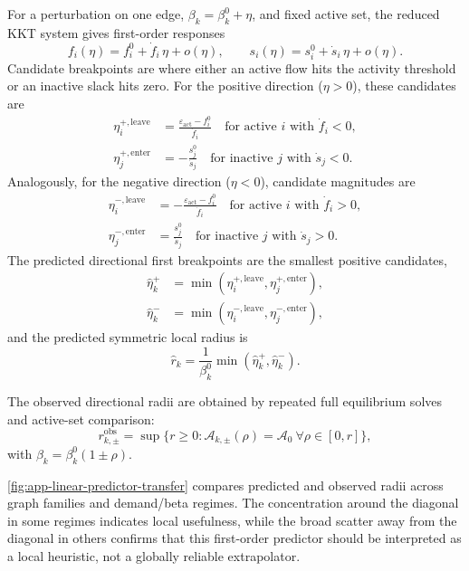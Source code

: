 \documentclass[twocolumn,english,groupedaddress, superscriptaddress,aps,pre,10pt,floatfix]{revtex4-2}
\begin{document}
For a perturbation on one edge, $\beta_k=\beta_k^0+\eta$, and fixed active set, the reduced KKT system gives first-order responses
\begin{equation}
f_i(\eta)=f_i^0+\dot f_i\,\eta+o(\eta),\qquad
s_i(\eta)=s_i^0+\dot s_i\,\eta+o(\eta).
\end{equation}
Candidate breakpoints are where either an active flow hits the activity threshold or an inactive slack hits zero.
For the positive direction ($\eta>0$), these candidates are
\begin{align}
\eta^{+,\mathrm{leave}}_i &= \frac{\varepsilon_{\mathrm{act}}-f_i^0}{\dot f_i}
\quad\text{for active }i\text{ with }\dot f_i<0,\\
\eta^{+,\mathrm{enter}}_j &= -\frac{s_j^0}{\dot s_j}
\quad\text{for inactive }j\text{ with }\dot s_j<0.
\end{align}
Analogously, for the negative direction ($\eta<0$), candidate magnitudes are
\begin{align}
\eta^{-,\mathrm{leave}}_i &= -\frac{\varepsilon_{\mathrm{act}}-f_i^0}{\dot f_i}
\quad\text{for active }i\text{ with }\dot f_i>0,\\
\eta^{-,\mathrm{enter}}_j &= \frac{s_j^0}{\dot s_j}
\quad\text{for inactive }j\text{ with }\dot s_j>0.
\end{align}
The predicted directional first breakpoints are the smallest positive candidates,
\begin{align}
\hat\eta_k^+ &= \min\!\left(\eta^{+,\mathrm{leave}}_i,\eta^{+,\mathrm{enter}}_j\right),\\
\hat\eta_k^- &= \min\!\left(\eta^{-,\mathrm{leave}}_i,\eta^{-,\mathrm{enter}}_j\right),
\end{align}
and the predicted symmetric local radius is
\begin{equation}
\hat r_k=\frac{1}{\beta_k^0}\min(\hat\eta_k^+,\hat\eta_k^-).
\end{equation}

The observed directional radii are obtained by repeated full equilibrium solves and active-set comparison:
\begin{equation}
r_{k,\pm}^{\mathrm{obs}}=\sup\{r\ge 0:\mathcal{A}_{k,\pm}(\rho)=\mathcal{A}_0\ \forall \rho\in[0,r]\},
\end{equation}
with $\beta_k=\beta_k^0(1\pm \rho)$.

\cref{fig:app-linear-predictor-transfer} compares predicted and observed radii across graph families and demand/beta regimes.
The concentration around the diagonal in some regimes indicates local usefulness, while the broad scatter away from the diagonal in others confirms that this first-order predictor should be interpreted as a local heuristic, not a globally reliable extrapolator.
\end{document}
